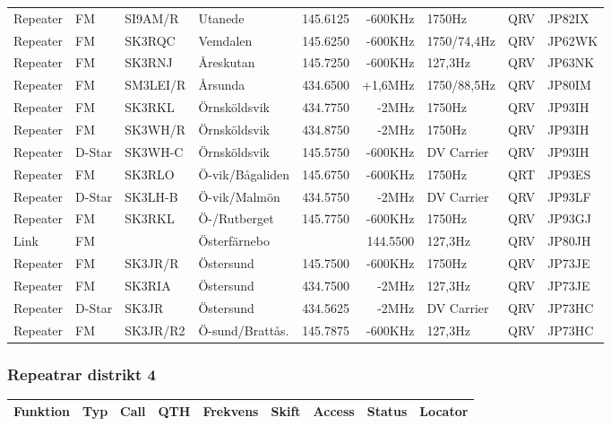 \begin{landscape}
\begin{longtable}{llllrrlcl}
Repeater & FM     & SI9AM/R  & Utanede          & 145.6125  & -600KHz  & 1750Hz        & QRV & JP82IX \\
Repeater & FM     & SK3RQC   & Vemdalen         & 145.6250  & -600KHz  & 1750/74,4Hz   & QRV & JP62WK \\
Repeater & FM     & SK3RNJ   & Åreskutan        & 145.7250  & -600KHz  & 127,3Hz       & QRV & JP63NK \\
Repeater & FM     & SM3LEI/R & Årsunda          & 434.6500  & +1,6MHz  & 1750/88,5Hz   & QRV & JP80IM \\
Repeater & FM     & SK3RKL   & Örnsköldsvik     & 434.7750  & -2MHz    & 1750Hz        & QRV & JP93IH \\
Repeater & FM     & SK3WH/R  & Örnsköldsvik     & 434.8750  & -2MHz    & 1750Hz        & QRV & JP93IH \\
Repeater & D-Star & SK3WH-C  & Örnsköldsvik     & 145.5750  & -600KHz  & DV Carrier    & QRV & JP93IH \\
Repeater & FM     & SK3RLO   & Ö-vik/Bågaliden  & 145.6750  & -600KHz  & 1750Hz        & QRT & JP93ES \\
Repeater & D-Star & SK3LH-B  & Ö-vik/Malmön     & 434.5750  & -2MHz    & DV Carrier    & QRV & JP93LF \\
Repeater & FM     & SK3RKL   & Ö-/Rutberget     & 145.7750  & -600KHz  & 1750Hz        & QRV & JP93GJ \\
Link     & FM     &          & Österfärnebo     &           & 144.5500 & 127,3Hz       & QRV & JP80JH \\
Repeater & FM     & SK3JR/R  & Östersund        & 145.7500  & -600KHz  & 1750Hz        & QRV & JP73JE \\
Repeater & FM     & SK3RIA   & Östersund        & 434.7500  & -2MHz    & 127,3Hz       & QRV & JP73JE \\
Repeater & D-Star & SK3JR    & Östersund        & 434.5625  & -2MHz    & DV Carrier    & QRV & JP73HC \\
Repeater & FM     & SK3JR/R2 & Ö-sund/Brattås.  & 145.7875  & -600KHz  & 127,3Hz       & QRV & JP73HC

\end{longtable}
\normalsize
\subsubsection{Repeatrar distrikt 4}
\footnotesize
\begin{longtable}{llllrrlcl}

\textbf{Funktion} & \textbf{Typ}    & \textbf{Call}   & \textbf{QTH} & \textbf{Frekvens} & 
\textbf{Skift}    & \textbf{Access} & \textbf{Status} & \textbf{Locator} \\ \hline \endhead


\end{longtable}
\end{landscape}
